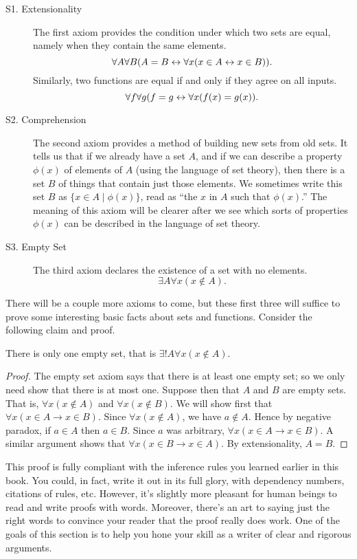 \begin{description}
\item[S1. Extensionality] The first axiom provides the condition under
  which two sets are equal, namely when they contain the same
  elements.
  \[ \forall A\forall B(A=B\leftrightarrow \forall x(x\in A\leftrightarrow x\in B)) . \]
  Similarly, two functions are equal if and only if they agree on all
  inputs.
  \[ \forall f\forall g(f=g\leftrightarrow \forall x(f(x)=g(x)) .\]
\item[S2. Comprehension] The second axiom provides a method of
  building new sets from old sets.  It tells us that if we already
  have a set $A$, and if we can describe a property $\phi (x)$ of
  elements of $A$ (using the language of set theory), then there is a
  set $B$ of things that contain just those elements.  We sometimes
  write this set $B$ as $\{ x\in A \mid \phi (x) \}$, read as ``the
  $x$ in $A$ such that $\phi (x)$.''  The meaning of this axiom will
  be clearer after we see which sorts of properties $\phi (x)$ can be
  described in the language of set theory.
\item[S3. Empty Set]  The third axiom declares the existence of a set
  with no elements.
  \[ \exists A\forall x(x\not\in A) . \]
\end{description}
There will be a couple more axioms to come, but these first three will
suffice to prove some interesting basic facts about sets and
functions.  Consider the following claim and proof.

\begin{prop} There is only one empty set, that is $\exists !A\forall
  x(x\not\in A)$.  \end{prop}

\begin{proof} The empty set axiom says that there is at least one
  empty set; so we only need show that there is at most one.  Suppose
  then that $A$ and $B$ are empty sets.  That is,
  $\forall x(x\not\in A)$ and $\forall x(x\not\in B)$.  We will show
  first that $\forall x(x\in A\to x\in B)$.  Since
  $\forall x(x\not\in A)$, we have $a\not\in A$.  Hence by negative
  paradox, if $a\in A$ then $a\in B$.  Since $a$ was arbitrary,
  $\forall x(x\in A\to x\in B)$.  A similar argument shows that
  $\forall x(x\in B\to x\in A)$.  By extensionality, $A=B$.
\end{proof}

This proof is fully compliant with the inference rules you learned
earlier in this book.  You could, in fact, write it out in its full
glory, with dependency numbers, citations of rules, etc.  However,
it's slightly more pleasant for human beings to read and write proofs
with words.  Moreover, there's an art to saying just the right words
to convince your reader that the proof really does work.  One of the
goals of this section is to help you hone your skill as a writer of
clear and rigorous arguments.


